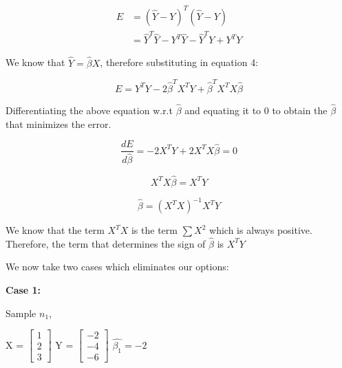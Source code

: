 \documentclass[12pt]{article}
\begin{document}
\begin{align}
E &= (\hat{Y} - Y)^T (\hat{Y} - Y)\\
&= \hat{Y}^T\hat{Y} - Y^T\hat{Y} - \hat{Y}^TY + Y^TY
\end{align}

\noindent We know that $\hat{Y} = \hat{\beta} X$, therefore substituting in equation 4:

\begin{equation}
E = Y^TY - 2\hat{\beta}^TX^TY + \hat{\beta}^TX^TX\hat{\beta}
\end{equation}

\vspace{2mm}

\noindent Differentiating the above equation w.r.t $\hat{\beta}$ and equating it to 0 to obtain the $\hat{\beta}$ that minimizes the error.

\begin{equation}
\dfrac{dE}{d\hat{\beta}} = -2X^TY + 2X^TX\hat{\beta} = 0
\end{equation}

\begin{equation}
X^TX\hat{\beta} = X^TY
\end{equation}

\begin{equation}
\hat{\beta} = (X^TX)^{-1}X^TY
\end{equation}

\vspace{3mm}
\noindent We know that the term $X^TX$ is the term $\sum X^2$ which is always positive. Therefore, the term that determines the sign of $\hat{\beta}$ is $X^TY$

\vspace{3mm}
\noindent We now take two cases which eliminates our options:

\vspace{3mm}
\noindent \textbf{Case 1:}
\vspace{3mm}

\noindent Sample $n_1$,
\vspace{3mm}

\begin{center}

X = $
\begin{bmatrix}
1\\2\\3
\end{bmatrix}
$
\hspace{2mm} Y = $
\begin{bmatrix}
-2\\-4\\-6
\end{bmatrix}
$
\hspace{2mm} $\hat{\beta_1} =  -2$
\end{center}
\end{document}
